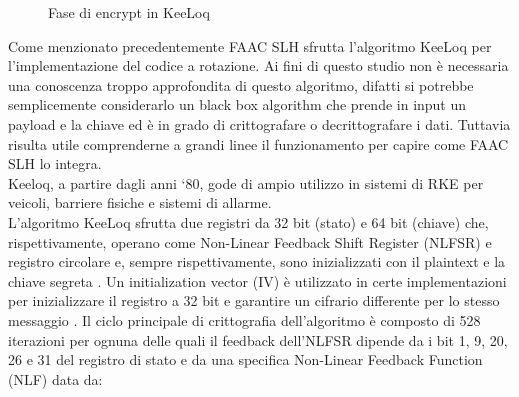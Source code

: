 \begin{figure} %
  \centering
  \def\stackalignment{r} %
  {\scriptsize}
  \caption{Fase di encrypt in KeeLoq \cite{keeloqwiki}}
  \label{fig:keeloq_encrypt}
\end{figure}
Come menzionato precedentemente FAAC SLH sfrutta l’algoritmo KeeLoq per l’implementazione del codice a rotazione. Ai fini di questo studio non è necessaria una conoscenza troppo approfondita di questo algoritmo, difatti si potrebbe semplicemente considerarlo un black box algorithm che prende in input un payload e la chiave ed è in grado di crittografare o decrittografare i dati. Tuttavia risulta utile comprenderne a grandi linee il funzionamento per capire come FAAC SLH lo integra.\\
Keeloq, a partire dagli anni ‘80, gode di ampio utilizzo in sistemi di RKE per veicoli, barriere fisiche e sistemi di allarme.\\
L’algoritmo KeeLoq sfrutta due registri da 32 bit (stato) e 64 bit (chiave) che, rispettivamente, operano come Non-Linear Feedback Shift Register (NLFSR) e registro circolare e, sempre rispettivamente, sono inizializzati con il plaintext e la chiave segreta \cite{keeloqwiki,algebraic_slide,cryptoeprint}. Un initialization vector (IV) è utilizzato in certe implementazioni per inizializzare il registro a 32 bit e garantire un cifrario differente per lo stesso messaggio \cite{keeloqwiki}.
Il ciclo principale di crittografia dell’algoritmo è composto di 528 iterazioni per ognuna delle quali il feedback dell’NLFSR dipende da i bit 1, 9, 20, 26 e 31 del registro di stato e da una specifica Non-Linear Feedback Function (NLF) data da:

